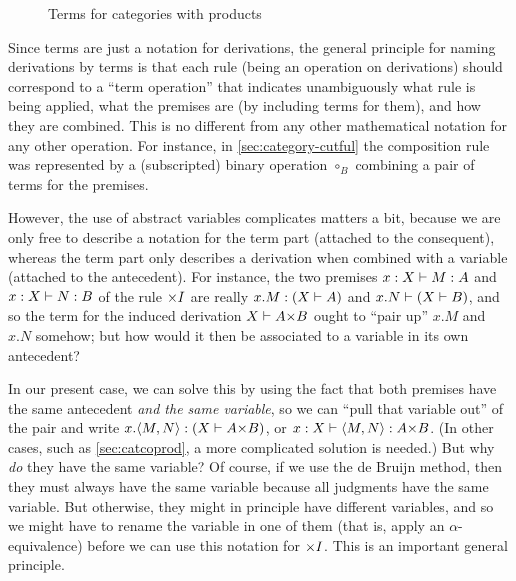 \begin{figure}
  \centering
  \caption{Terms for categories with products}
  \label{fig:catprod-terms}
\end{figure}

Since terms are just a notation for derivations, the general principle for naming derivations by terms is that each rule (being an operation on derivations) should correspond to a ``term operation'' that indicates unambiguously what rule is being applied, what the premises are (by including terms for them), and how they are combined.
This is no different from any other mathematical notation for any other operation.
For instance, in \cref{sec:category-cutful} the composition rule was represented by a (subscripted) binary operation $\circ_B$ combining a pair of terms for the premises.

However, the use of abstract variables complicates matters a bit, because we are only free to describe a notation for the term part (attached to the consequent), whereas the term part only describes a derivation when combined with a variable (attached to the antecedent).
For instance, the two premises $x:X\vdash M:A$ and $x:X\vdash N:B$ of the rule $\timesI$ are really $x.M:(X\vdash A)$ and $x.N\vdash (X\vdash B)$, and so the term for the induced derivation $X\types A\times B$ ought to ``pair up'' $x.M$ and $x.N$ somehow; but how would it then be associated to a variable in its own antecedent?

In our present case, we can solve this by using the fact that both premises have the same antecedent \emph{and the same variable}, so we can ``pull that variable out'' of the pair and write $x.\pair M N : (X\types A\times B)$, or $x:X\types \pair M N :A\times B$.
(In other cases, such as \cref{sec:catcoprod}, a more complicated solution is needed.)
But why \emph{do} they have the same variable?
Of course, if we use the de Bruijn method, then they must always have the same variable because all judgments have the same variable.
But otherwise, they might in principle have different variables, and so we might have to rename the variable in one of them (that is, apply an $\alpha$-equivalence) before we can use this notation for $\timesI$.
This is an important general principle.

